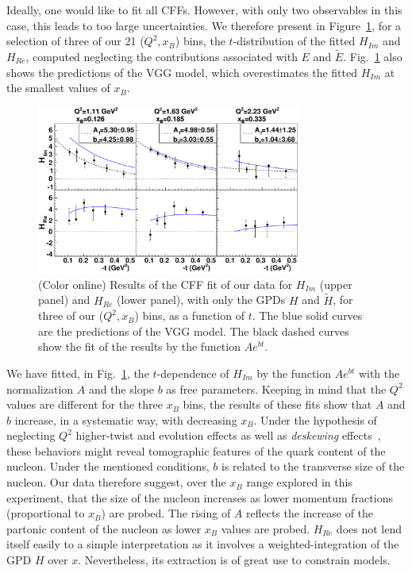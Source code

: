 \documentclass[nofootinbib,twocolumn,showpacs,prl,superscriptaddress,secnumarabic,amssymb,nobibnotes,aps,floatfix]{revtex4-1}
\begin{document}
Ideally, one would like to fit all CFFs. However, with only two observables in this case,
this leads to too large uncertainties. We therefore present in Figure~\ref{fig:cff}, for
a selection of three of our 21 ($Q^2,x_B$) bins, the $t$-distribution of the fitted
$H_{Im}$ and $H_{Re}$, computed neglecting the contributions associated with $E$ and
$\tilde E$.
Fig.~\ref{fig:cff} also shows the predictions of the VGG model, which
overestimates the fitted $H_{Im}$ at the smallest values of $x_B$.
\begin{figure}[tb]
\includegraphics[width=8.7cm]{fig5.pdf}
\vspace{-0.7cm}
\caption{(Color online) Results of the CFF fit of our data for
$H_{Im}$ (upper panel) and $H_{Re}$ (lower panel), with only
the GPDs $H$ and $\tilde H$, for three of our ($Q^2,x_B$) bins, as a function of $t$.
The blue solid curves are the predictions of the VGG model.
The black dashed curves show the fit of the results by the function $Ae^{bt}$.}
\label{fig:cff}
\end{figure}

We have fitted, in Fig.~\ref{fig:cff}, the $t$-dependence of $H_{Im}$ by
the function $Ae^{bt}$ with the normalization $A$ and the slope $b$ as free parameters.
Keeping in mind that the $Q^2$ values are different
for the three $x_B$ bins, the results of these fits show 
that $A$ and $b$ increase, in a systematic way, with decreasing $x_B$.
Under the hypothesis of neglecting $Q^2$ higher-twist and evolution effects  
as well as \textit{deskewing} effects~\cite{deskewing},
these behaviors might reveal tomographic features of the quark content of the nucleon. 
Under the mentioned conditions, $b$ is related to the transverse size of the nucleon.
Our data therefore suggest, over the $x_B$ range explored in this experiment, that the size of
the nucleon increases as lower momentum fractions (proportional to $x_B$) are probed.
The rising of $A$ reflects the increase of the partonic content of the nucleon
as lower $x_B$ values are probed.
$H_{Re}$ does not lend itself easily to a simple interpretation
as it involves a weighted-integration of the GPD $H$ over $x$. Nevertheless, its
extraction is of great use to constrain models.
\end{document}
